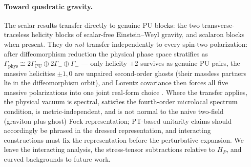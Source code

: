 \documentclass[11pt]{article}
\theoremstyle{definition}
\theoremstyle{remark}
\begin{document}
\paragraph{Toward quadratic gravity.}
The scalar results transfer directly to genuine PU blocks: the two
transverse-traceless helicity blocks of scalar-free Einstein--Weyl
gravity, and scalaron blocks when present.  They do \emph{not} transfer
independently to every spin-two polarization: after diffeomorphism
reduction the physical phase space stratifies as
$\Gamma_{\mathrm{phys}}\cong2\Gamma_{\mathrm{PU}}\oplus2\Gamma_-
\oplus\Gamma_-$ --- only helicity $\pm2$ survives as genuine PU pairs,
the massive helicities $\pm1,0$ are unpaired second-order ghosts
(their massless partners lie in the diffeomorphism orbit), and Lorentz
covariance then forces all five massive polarizations into one joint
real-form choice \cite{companion4}.  Where the transfer applies, the
physical vacuum is spectral, satisfies the fourth-order microlocal
spectrum condition, is metric-independent, and is not normal to the
naive two-field (graviton plus ghost) Fock representation; PT-based
unitarity claims should accordingly be phrased in the dressed
representation, and interacting constructions must fix the
representation before the perturbative expansion.  We leave the
interacting analysis, the stress-tensor subtractions relative to $H_P$,
and curved backgrounds to future work.
\end{document}
